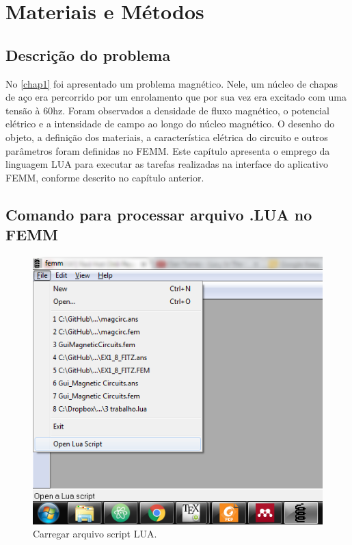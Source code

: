 \section{Materiais e Métodos}

\subsection{Descrição do problema}
No \ref{chap1} foi apresentado um problema magnético. Nele, um núcleo de chapas de aço era percorrido por um enrolamento que por sua vez era excitado com uma tensão à 60hz. Foram observados a densidade de fluxo magnético, o potencial elétrico e a intensidade de campo ao longo do núcleo magnético. O desenho do objeto, a definição dos materiais, a característica elétrica do circuito e outros parâmetros foram definidas no FEMM. Este capítulo apresenta o emprego da linguagem LUA para executar as tarefas realizadas na interface do aplicativo FEMM, conforme descrito no capítulo anterior.

\subsection{Comando para processar arquivo .LUA no FEMM}

\begin{figure}[h]
\centering
\includegraphics[scale=1]{img/assig2/open_lua_script.png}
\caption[Carregar arquivo script LUA]{Carregar arquivo script LUA.}
\label{circ}
\end{figure}
